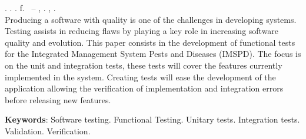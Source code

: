 
\begin{resumo}[ABSTRACT]
\begin{SingleSpacing}

\imprimirautorcitacao. \imprimirtitleabstract. \imprimirdata. \pageref {LastPage} f. \imprimirprojeto\ – \imprimirprograma, \imprimirinstituicao. \imprimirlocal, \imprimirdata.\\

    
    Producing a software with quality is one of the challenges in developing systems. Testing assists in reducing flaws by playing a key role in increasing software quality and evolution. This paper consists in the development of functional tests for the Integrated Management System Pests and Diseases (IMSPD). The focus is on the unit and integration tests, these tests will cover the features currently implemented in the system. Creating tests will ease the development of the application allowing the verification of implementation and integration errors before releasing new features.



\textbf{Keywords}: Software testing. Functional Testing. Unitary tests. Integration tests. Validation. Verification.
\end{SingleSpacing}
\end{resumo}

